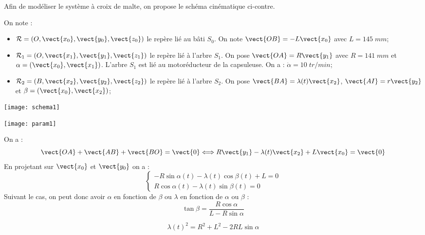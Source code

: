 \begin{minipage}[c]{.4\linewidth}
Afin de modéliser le système à croix de malte, on propose le schéma cinématique ci-contre. 


On note :
\begin{itemize}
\item $\mathcal{R}=\left( O,\vect{x_0},\vect{y_0},\vect{z_0}\right)$ le repère lié au bâti $S_0$. On note $\vect{OB}=-L\vect{x_0}$ avec $L = 145\; mm$;
\item $\mathcal{R}_1=\left( O,\vect{x_1},\vect{y_1},\vect{z_1}\right)$ le repère lié à l'arbre $S_1$. On pose $\vect{OA}=R\vect{y_1}$  avec $R =141\;mm$ et $\alpha = \left( \vect{x_0}, \vect{x_1}\right)$. L'arbre $S_1$ est lié au motoréducteur de la capsuleuse. On a : $\dot{\alpha} = 10\;tr/min$;
\item  $\mathcal{R}_2=\left( B,\vect{x_2},\vect{y_2},\vect{z_2}\right)$ le repère lié à l'arbre $S_2$. On pose $\vect{BA}=\lambda(t)\vect{x_2}$,  $\vect{AI}=r\vect{y_2}$ et $\beta = \left( \vect{x_0}, \vect{x_2}\right)$;
\end{itemize}


\end{minipage} \hfill
\begin{minipage}[c]{.55\linewidth}
\begin{center}
 \texttt{[image: schema1]}
\end{center}
\end{minipage}



\ifprof
\begin{corrige}
\begin{center}
 \texttt{[image: param1]}
\end{center}
\end{corrige}
\else\fi


\ifprof
\begin{corrige}

On a :
$$ \vect{OA} + \vect{AB} + \vect{BO} = \vect{0} \Longleftrightarrow 
R\vect{y_1} - \lambda(t)\vect{x_2} + L \vect{x_0} = \vect{0}
$$
En projetant sur $\vect{x_0}$ et $\vect{y_0}$ on a :
$$
\left\{
\begin{array}{l}
- R \sin \alpha(t) - \lambda(t) \cos\beta(t) + L = 0\\
R\cos\alpha(t) - \lambda(t)\sin \beta(t)=0
\end{array}
\right.
$$
Suivant le cas, on peut donc avoir $\alpha$ en fonction de $\beta$ ou $\lambda$ en fonction de $\alpha$ ou $\beta$ :
$$
\tan \beta = \dfrac{R\cos\alpha}{L-R\sin\alpha}
$$

$$
\lambda(t)^2 = R^2 + L^2 - 2RL \sin\alpha
$$
\end{corrige}
\else\fi

